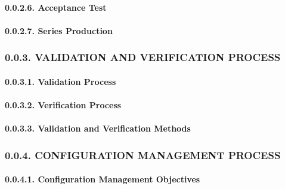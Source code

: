 \documentclass[
]{article}
\begin{document}
\hypertarget{acceptance-test}{%
\paragraph{0.0.2.6. Acceptance Test}\label{acceptance-test}}

\hypertarget{series-production}{%
\paragraph{0.0.2.7. Series Production}\label{series-production}}

\hypertarget{validation-and-verification-process}{%
\subsubsection{0.0.3. VALIDATION AND VERIFICATION
PROCESS}\label{validation-and-verification-process}}

\hypertarget{validation-process}{%
\paragraph{0.0.3.1. Validation Process}\label{validation-process}}

\hypertarget{verification-process}{%
\paragraph{0.0.3.2. Verification Process}\label{verification-process}}

\hypertarget{validation-and-verification-methods}{%
\paragraph{0.0.3.3. Validation and Verification
Methods}\label{validation-and-verification-methods}}

\hypertarget{configuration-management-process}{%
\subsubsection{0.0.4. CONFIGURATION MANAGEMENT
PROCESS}\label{configuration-management-process}}

\hypertarget{configuration-management-objectives}{%
\paragraph{0.0.4.1. Configuration Management
Objectives}\label{configuration-management-objectives}}
\end{document}
